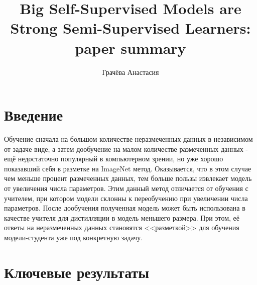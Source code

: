 \documentclass{article}
\title{Big Self-Supervised Models are Strong Semi-Supervised Learners: paper summary}
\author{Грачёва Анастасия}
\begin{document}
 
\maketitle

\section{Введение}
Обучение сначала на большом количестве неразмеченных данных в независимом от задаче виде, а затем дообучение на малом количестве размеченных данных - ещё недостаточно популярный в компьютерном зрении, но уже хорошо показавший себя в разметке на ImageNet метод. Оказывается, что в этом случае чем меньше процент размеченных данных, тем больше пользы извлекает модель от увеличения числа параметров. Этим данный метод отличается от обучения с учителем, при котором модели склонны к переобучению при увеличении числа параметров. После дообучения полученная модель может быть использована в качестве учителя для дистилляции в модель меньшего размера. При этом, её ответы на неразмеченных данных становятся <<разметкой>> для обучения модели-студента уже под конкретную задачу.

\section{Ключевые результаты}
\end{document}

